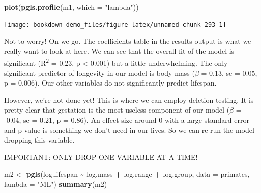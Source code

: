 \documentclass[
]{book}
\newenvironment{Shaded}{\begin{snugshade}}{\end{snugshade}}
\newcommand{\DataTypeTok}[1]{\textcolor[rgb]{0.13,0.29,0.53}{#1}}
\newcommand{\KeywordTok}[1]{\textcolor[rgb]{0.13,0.29,0.53}{\textbf{#1}}}
\newcommand{\NormalTok}[1]{#1}
\newcommand{\OperatorTok}[1]{\textcolor[rgb]{0.81,0.36,0.00}{\textbf{#1}}}
\newcommand{\StringTok}[1]{\textcolor[rgb]{0.31,0.60,0.02}{#1}}
\begin{document}
\begin{Shaded}
\begin{Highlighting}[]
\KeywordTok{plot}\NormalTok{(}\KeywordTok{pgls.profile}\NormalTok{(m1, }\DataTypeTok{which =} \StringTok{"lambda"}\NormalTok{))}
\end{Highlighting}
\end{Shaded}

\begin{center}\texttt{[image: bookdown-demo\_files/figure-latex/unnamed-chunk-293-1]} \end{center}

Not to worry! On we go. The coefficients table in the results output is what we really want to look at here. We can see that the overall fit of the model is significant (R\textsuperscript{2} = 0.23, p \textless{} 0.001) but a little underwhelming. The only significant predictor of longevity in our model is body mass (\(\beta\) = 0.13, se = 0.05, p = 0.006). Our other variables do not significantly predict lifespan.

However, we're not done yet! This is where we can employ deletion testing. It is pretty clear that gestation is the most useless component of our model (\(\beta\) = -0.04, se = 0.21, p = 0.86). An effect size around 0 with a large standard error and p-value is something we don't need in our lives. So we can re-run the model dropping this variable.

IMPORTANT: ONLY DROP ONE VARIABLE AT A TIME!

\begin{Shaded}
\begin{Highlighting}[]
\NormalTok{m2 \textless{}{-}}\StringTok{ }\KeywordTok{pgls}\NormalTok{(log.lifespan }\OperatorTok{\textasciitilde{}}\StringTok{ }\NormalTok{log.mass }\OperatorTok{+}\StringTok{ }\NormalTok{log.range }\OperatorTok{+}\StringTok{ }\NormalTok{log.group,}
           \DataTypeTok{data =}\NormalTok{ primates, }\DataTypeTok{lambda =} \StringTok{"ML"}\NormalTok{)}
\KeywordTok{summary}\NormalTok{(m2)}
\end{Highlighting}
\end{Shaded}
\end{document}
